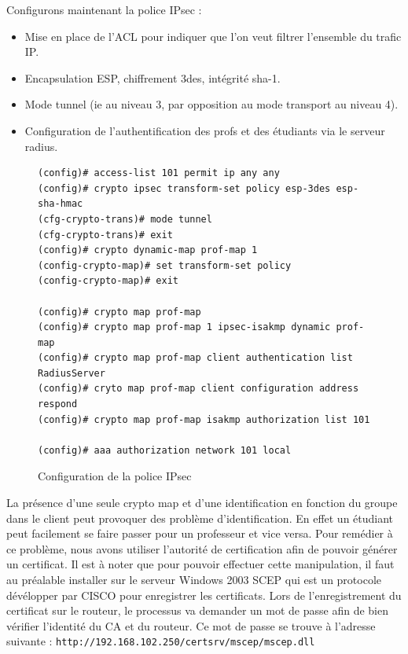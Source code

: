 Configurons maintenant la police IPsec :
\begin{itemize}
	\item Mise en place de l'ACL pour indiquer que l'on veut filtrer l'ensemble du trafic IP.
	\item Encapsulation ESP, chiffrement 3des, intégrité sha-1.
	\item Mode tunnel (ie au niveau 3, par opposition au mode transport au niveau 4).
	\item Configuration de l'authentification des profs et des étudiants via le serveur radius.
\end{itemize}

\begin{figure}[H]
	\begin{center}
		\begin{minipage}{1\textwidth}
			\begin{lstlisting}[frame=trBL]
(config)# access-list 101 permit ip any any
(config)# crypto ipsec transform-set policy esp-3des esp-sha-hmac
(cfg-crypto-trans)# mode tunnel
(cfg-crypto-trans)# exit
(config)# crypto dynamic-map prof-map 1
(config-crypto-map)# set transform-set policy
(config-crypto-map)# exit

(config)# crypto map prof-map
(config)# crypto map prof-map 1 ipsec-isakmp dynamic prof-map
(config)# crypto map prof-map client authentication list RadiusServer
(config)# cryto map prof-map client configuration address respond
(config)# crypto map prof-map isakmp authorization list 101

(config)# aaa authorization network 101 local
			\end{lstlisting}
		\end{minipage}
	\end{center}
	\caption{Configuration de la police IPsec}
	\label{configuration_police_ipsec}
\end{figure}

La présence d'une seule crypto map et d'une identification en fonction du groupe dans le client peut provoquer des problème d'identification. En effet un étudiant peut facilement se faire passer pour un professeur et vice versa.
Pour remédier à ce problème, nous avons utiliser l'autorité de certification afin de pouvoir générer un certificat. Il est à noter que pour pouvoir effectuer cette manipulation, il faut au préalable installer sur le serveur Windows 2003 SCEP qui est un protocole dévélopper par CISCO pour enregistrer les certificats.
Lors de l'enregistrement du certificat sur le routeur, le processus va demander un mot de passe afin de bien vérifier l'identité du CA et du routeur. Ce mot de passe se trouve à l'adresse suivante : \verb|http://192.168.102.250/certsrv/mscep/mscep.dll|

